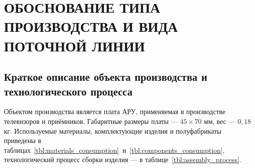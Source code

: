 \section[Обоснование типа производства и вида поточной линии]{
  ОБОСНОВАНИЕ ТИПА ПРОИЗВОДСТВА И ВИДА \\
  ПОТОЧНОЙ ЛИНИИ
}
\label{sec:choice}

\subsection{Краткое описание объекта производства и технологического процесса}

Объектом производства является плата АРУ, применяемая в производстве
телевизоров и приёмников. Габаритные размеры платы --- $45 \times 70$ мм,
вес --- $0{,}18$ кг. Используемые материалы, комплектующие изделия и полуфабрикаты
приведены в таблицах~\ref{tbl:materials_consumption}~и~\ref{tbl:components_consumption},
технологический процесс сборки изделия --- в таблице~\ref{tbl:assembly_process}.

